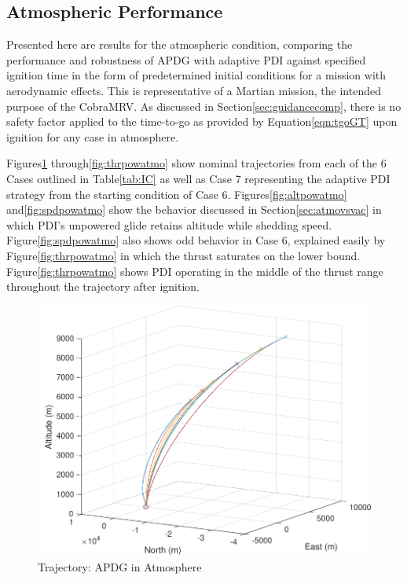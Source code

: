 \subsection{Atmospheric Performance} \label{sec:atmoperf}

Presented here are results for the atmospheric condition, comparing the performance and robustness of APDG with adaptive PDI against specified ignition time in the form of predetermined initial conditions for a mission with aerodynamic effects. This is representative of a Martian mission, the intended purpose of the CobraMRV. As discussed in Section\:\ref{sec:guidancecomp}, there is no safety factor applied to the time-to-go as provided by Equation\:\ref{eqn:tgoGT} upon ignition for any case in atmosphere. 

Figures\:\ref{fig:trajpowatmo} through\:\ref{fig:thrpowatmo} show nominal trajectories from each of the 6 Cases outlined in Table\:\ref{tab:IC} as well as Case 7 representing the adaptive PDI strategy from the starting condition of Case 6. Figures\:\ref{fig:altpowatmo} and\:\ref{fig:spdpowatmo} show the behavior discussed in Section\:\ref{sec:atmovsvac} in which PDI's unpowered glide retains altitude while shedding speed. Figure\:\ref{fig:spdpowatmo} also shows odd behavior in Case 6, explained easily by Figure\:\ref{fig:thrpowatmo} in which the thrust saturates on the lower bound. Figure\:\ref{fig:thrpowatmo} shows PDI operating in the middle of the thrust range throughout the trajectory after ignition.

\begin{figure}[H]
	\centering
	\begin{minipage}{4.5 in}
		\includegraphics[width=\linewidth]{Figures/trajpowatmo.pdf}
		\caption{Trajectory: APDG in Atmosphere \label{fig:trajpowatmo} }
	\end{minipage}
\end{figure}

